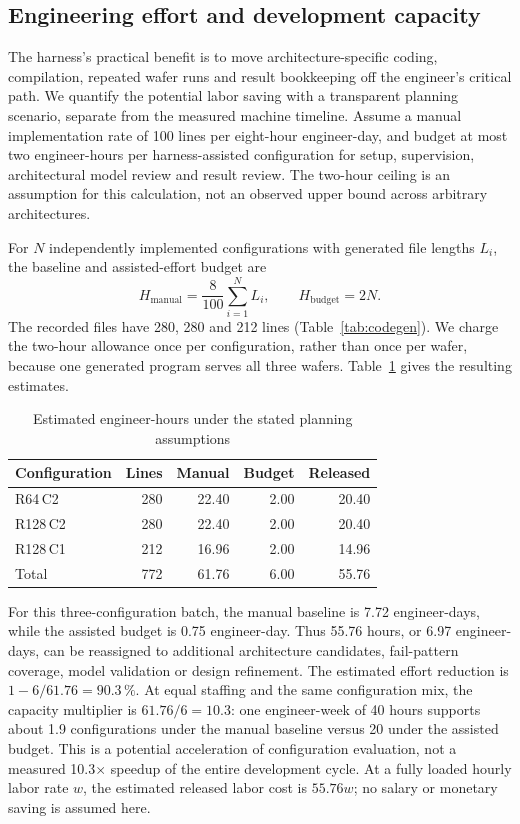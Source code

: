 \documentclass[conference]{IEEEtran}
\begin{document}
\subsection{Engineering effort and development capacity}
\label{sec:effort}

The harness's practical benefit is to move architecture-specific coding,
compilation, repeated wafer runs and result bookkeeping off the engineer's
critical path. We quantify the potential labor saving with a transparent
planning scenario, separate from the measured machine timeline. Assume a
manual implementation rate of 100 lines per eight-hour engineer-day, and
budget at most two engineer-hours per harness-assisted configuration for
setup, supervision, architectural model review and result review. The
two-hour ceiling is an assumption for this calculation, not an observed
upper bound across arbitrary architectures.

For $N$ independently implemented configurations with generated file lengths
$L_i$, the baseline and assisted-effort budget are
\begin{equation}
H_{\mathrm{manual}}=\frac{8}{100}\sum_{i=1}^{N}L_i,
\qquad H_{\mathrm{budget}}=2N.
\label{eq:effort}
\end{equation}
The recorded files have 280, 280 and 212 lines (Table~\ref{tab:codegen}).
We charge the two-hour allowance once per configuration, rather than once
per wafer, because one generated program serves all three wafers.
Table~\ref{tab:effort} gives the resulting estimates.

\begin{table}[t]
\centering
\caption{Estimated engineer-hours under the stated planning assumptions}
\label{tab:effort}
\setlength{\tabcolsep}{3pt}
\begin{tabular}{lrrrr}
\toprule
Configuration & Lines & Manual & Budget & Released \\
\midrule
R64\,C2 & 280 & 22.40 & 2.00 & 20.40 \\
R128\,C2 & 280 & 22.40 & 2.00 & 20.40 \\
R128\,C1 & 212 & 16.96 & 2.00 & 14.96 \\
\midrule
Total & 772 & 61.76 & 6.00 & 55.76 \\
\bottomrule
\end{tabular}
\end{table}

For this three-configuration batch, the manual baseline is 7.72
engineer-days, while the assisted budget is 0.75 engineer-day. Thus 55.76
hours, or 6.97 engineer-days, can be reassigned to additional architecture
candidates, fail-pattern coverage, model validation or design refinement.
The estimated effort reduction is
$1-6/61.76=90.3\,\%$. At equal staffing and the same configuration mix,
the capacity multiplier is $61.76/6=10.3$: one engineer-week of 40 hours
supports about 1.9 configurations under the manual baseline versus 20 under
the assisted budget. This is a potential acceleration of configuration
evaluation, not a measured 10.3$\times$ speedup of the entire development
cycle. At a fully loaded hourly labor rate $w$, the estimated released labor
cost is $55.76w$; no salary or monetary saving is assumed here.
\end{document}

